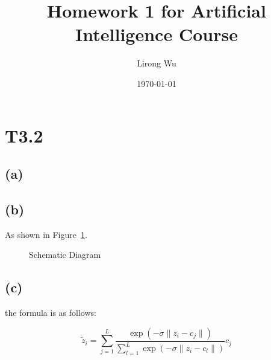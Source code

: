 \documentclass[]{article}
\title{Homework 1 for Artificial Intelligence Course}
\author{Lirong Wu}
\date{\today}
\begin{document}
\maketitle

\section*{T3.2}

\subsection*{(a)}
\lipsum[11]   %

\subsection*{(b)}
\lipsum[11]   %
As shown in Figure~\ref{fig1}.

\begin{figure}[H]	\centering
	\vfill
	\qquad
	\caption{Schematic Diagram}
	\label{fig1} 
\end{figure}

\subsection*{(c)}
\lipsum[11]   %
the formula is as follows:

\begin{equation} \label{eq:softquant}
\tilde{z}_i = \sum_{j=1}^L \frac{\exp(-\sigma\|z_i-c_j\|)}{\sum_{l=1}^L \exp(-\sigma\|z_i-c_l\|)} c_j
\end{equation}
\end{document}

